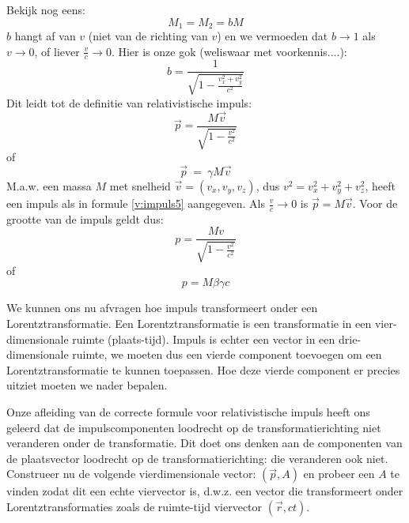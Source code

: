 Bekijk nog eens:
\begin{displaymath}
M_{1} = M_{2} = bM
\end{displaymath}
$b$ hangt af van $v$ (niet van de richting van $v$) en we vermoeden
dat $b \rightarrow 1$ als $v \rightarrow 0$, of liever
$\frac{v}{c} \rightarrow 0$.
Hier is onze gok (weliswaar met voorkennis....):
\begin{displaymath}
b = \frac{1}{\sqrt{1 - \frac{v^{2}_{x} + v^{2}_{y}}{c^{2}}}}
\end{displaymath}
Dit leidt tot de definitie van relativistische impuls:
\begin{equation}
\label{v:impuls5}
\vec{p} = \frac{M\vec{v}}{\sqrt{1 - \frac{v^{2}} {c^{2}} } }
\end{equation}
of
\begin{displaymath}
\vec{p}~=~\gamma M \vec{v}
\end{displaymath}
M.a.w. een massa $M$ met snelheid $\vec{v} = (v_{x}, v_{y}, v_{z})$,
dus $v^{2} = v^{2}_{x} + v^{2}_{y} + v^{2}_{z}$, heeft een impuls als 
in formule \ref{v:impuls5} aangegeven.
Als $\frac{v}{c} \rightarrow 0$ is $\vec{p} = M \vec{v}$.
Voor de grootte van de impuls geldt dus:
\begin{displaymath}
p = \frac{Mv}{\sqrt{1 - \frac{v^{2}}{c^{2}} } }
\end{displaymath}
of
\begin{equation}
\label{v:impuls}
p = M\beta\gamma c
\end{equation}

We kunnen ons nu afvragen hoe impuls transformeert onder een
Lorentztransformatie. Een Lorentztransformatie is een transformatie
in een vier-dimensionale ruimte (plaats-tijd). Impuls is echter een
vector in een drie-dimensionale ruimte, we moeten dus een vierde
component toevoegen om een Lorentztransformatie te kunnen toepassen.
Hoe deze vierde component er precies uitziet moeten we nader bepalen.

Onze afleiding van de correcte formule voor relativistische impuls
heeft ons geleerd dat de impulscomponenten loodrecht op de 
transformatierichting niet veranderen onder de transformatie.
Dit doet ons denken aan de componenten van de plaatsvector loodrecht
op de transformatierichting: die veranderen ook niet.
Construeer nu de volgende vierdimensionale vector: $(\vec{p},A)$ en
probeer een $A$ te vinden zodat dit een echte viervector is, d.w.z.
een vector die transformeert onder Lorentztransformaties zoals 
de ruimte-tijd viervector $(\vec{r},ct)$.


